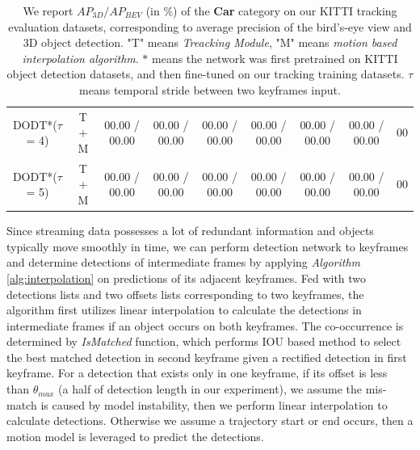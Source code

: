 \documentclass[letterpaper, 10 pt, conference]{ieeeconf}  %
\begin{document}
\begin{table}
{\begin{tabular}{ccccccccc}
			\multicolumn{1}{c|}{DODT*($\tau$ = 4)}     &\multicolumn{1}{c|}{T + M} & 00.00 / 00.00  & 00.00 / 00.00 & \multicolumn{1}{c|}{00.00 / 00.00}  & 00.00 / 00.00 & 00.00 / 00.00 & \multicolumn{1}{c|}{00.00 / 00.00}   & 00\\
			\multicolumn{1}{c|}{DODT*($\tau$ = 5)}     &\multicolumn{1}{c|}{T + M} & 00.00 / 00.00  & 00.00 / 00.00 & \multicolumn{1}{c|}{00.00 / 00.00}  & 00.00 / 00.00 & 00.00 / 00.00 & \multicolumn{1}{c|}{00.00 / 00.00}   & 00\\\midrule
		\end{tabular}}
	\caption{We report $AP_{3D}/AP_{BEV}$ (in \%) of the \textbf{Car} category on our KITTI tracking evaluation datasets, 
		corresponding to average precision of the bird’s-eye view and 3D object detection. "T" means \textit{Treacking Module}, "M" means \textit{motion based interpolation algorithm}. 
		 $*$ means the network was first pretrained on KITTI object detection datasets, and then fine-tuned on our tracking training datasets. $\tau$ means temporal stride between two keyframes input.} 
	\label{table:result_detection}
	\vspace{-0.4cm}
\end{table}

Since streaming data possesses a lot of redundant information and objects typically move smoothly in time, we can perform detection network to keyframes and determine detections of intermediate frames by applying \textit{Algorithm} \ref{alg:interpolation} on predictions of its adjacent keyframes. Fed with two detections lists and two offsets lists corresponding to two keyframes, the algorithm first utilizes linear interpolation to calculate the detections in intermediate frames if an object occurs on both keyframes. The co-occurrence is determined by \textit{IsMatched} function, which performs IOU based method to select the best matched detection in second keyframe given a rectified detection in first keyframe. For a detection that exists only in one keyframe, if its offset is less than $\theta_{max}$ (a half of detection length in our experiment), we assume the mis-match is caused by model instability, then we perform linear interpolation to calculate detections. Otherwise we assume a trajectory start or end occurs, then a motion model is leveraged to predict the detections.
\end{document}
